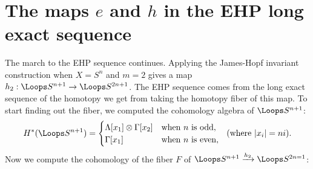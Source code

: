 \section{The maps \texorpdfstring{$e$ and $h$}{e and h} in the EHP long exact sequence} %
\label{TheMapsEandHinTheEHPLES}
\ifx\OutputTheMapsEandHinTheEHPLES\undefined\else
The march to the EHP sequence continues.
Applying the James-Hopf invariant construction when $X = S^n$ and $m = 2$ gives a map $h_2: \Loops S^{n+1} \to \Loops S^{2n+1}$.  The EHP sequence comes from the long exact sequence of the homotopy we get from taking the homotopy fiber of this map.  To start finding out the fiber, we computed the cohomology algebra of $\Loops S^{n+1}$:
\[
H^* (\Loops S^{n+1}) = \begin{cases} \Lambda[x_1] \otimes \Gamma[x_2] & \hbox{when $n$ is odd}, \\ \Gamma[x_1] & \hbox{when $n$ is even}, \end{cases}\textup{\ \ (where $|x_i| = ni$).}
\]
Now we compute the cohomology of the fiber $F $ of $\Loops S^{n+1}\xrightarrow{h_2} \Loops S^{2n=1}   $:

